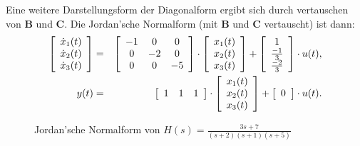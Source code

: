 \nit Eine weitere Darstellungsform der Diagonalform ergibt sich durch vertauschen von $\boldsymbol{B}$ und $\boldsymbol{C}$.
Die Jordan'sche Normalform (mit $\boldsymbol{B}$ und $\boldsymbol{C}$ vertauscht) ist dann:\\
\begin{eqnarray*}
\left [ 
\begin{array}{c}
\dot{x}_1(t)\\
\dot{x}_2(t)\\
\dot{x}_3(t)\\
\end{array}
\right ] &=&
\left [ 
\begin{array}{c c c}
-1 & 0 & 0\\
0 & -2 & 0\\
0 & 0 & -5\\
\end{array}
\right ]\cdot
\left [ 
\begin{array}{c}
x_1(t)\\
x_2(t)\\
x_3(t)\\
\end{array}
\right ]+
\left [ 
\begin{array}{c}
1\\
\frac{-1}{3}\\
\frac{-2}{3}\\
\end{array}
\right ]\cdot
u(t),\\
y(t) &= &
\left [ 
\begin{array}{c c c }
1 &  1 & 1\\
\end{array}
\right ] \cdot
\left [ 
\begin{array}{c}
x_1(t)\\
x_2(t)\\
x_3(t)\\
\end{array}
\right ]+
\left [ 
\begin{array}{c}
$0$ \\
\end{array}
\right ] \cdot
u(t).
\end{eqnarray*}

\begin{figure}[!htb]
\begin{center}
\vspace*{-4mm}\caption{Jordan'sche Normalform von $H(s)=\frac{3s+7}{(s+2)(s+1)(s+5)}$}
\end{center}%
\end{figure}


